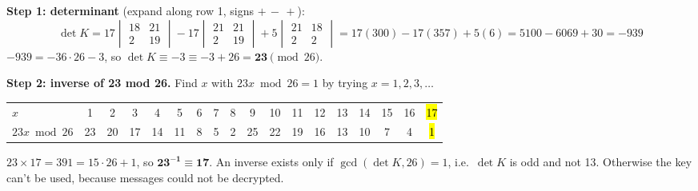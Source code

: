 \textbf{Step 1: determinant} (expand along row 1, signs $+\,-\,+$):
\[
\det K = 17\begin{vmatrix}18&21\\2&19\end{vmatrix} - 17\begin{vmatrix}21&21\\2&19\end{vmatrix} + 5\begin{vmatrix}21&18\\2&2\end{vmatrix}
= 17(300) - 17(357) + 5(6) = 5100 - 6069 + 30 = -939
\]
$-939 = -36\cdot26 - 3$, so $\det K \equiv -3 \equiv -3 + 26 = \mathbf{23} \pmod{26}$.

\textbf{Step 2: inverse of 23 mod 26.} Find $x$ with $23x \bmod 26 = 1$ by trying $x = 1, 2, 3, \dots$
\begin{center}\small\setlength{\tabcolsep}{3.2pt}
\begin{tabular}{@{}l*{17}{c}@{}}
\toprule
$x$ & 1&2&3&4&5&6&7&8&9&10&11&12&13&14&15&16&\hl{17}\\
$23x \bmod 26$ & 23&20&17&14&11&8&5&2&25&22&19&16&13&10&7&4&\hl{1}\\
\bottomrule
\end{tabular}
\end{center}
$23 \times 17 = 391 = 15\cdot26 + 1$, so $\mathbf{23^{-1} \equiv 17}$.
An inverse exists only if $\gcd(\det K, 26) = 1$, i.e.\ $\det K$ is odd and not 13. Otherwise the key can't be used, because messages could not be decrypted.

